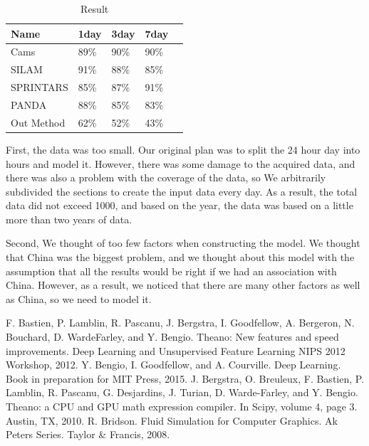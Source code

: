 \documentclass{kcc}
\begin{document}
\begin{table}[h!]
  \caption{Result}
  \centering
  \scriptsize 
  \begin{tabular}{l l l l l} \toprule 
    Name & 1day & 3day & 7day \\
    \midrule
    Cams & 89\% &  90\% & 90\%\\
    \midrule
    SILAM & 91\% & 88\% & 85\%\\
    \midrule
    SPRINTARS & 85\% & 87\% & 91\%\\
    \midrule
    PANDA & 88\% & 85\% & 83\%\\
    \midrule
    Out Method & 62\% & 52\% & 43\% \\
    \bottomrule
  \end{tabular}
  \label{tab:result}
\end{table}

First, the data was too small. Our original plan was to split the 24 hour day into hours and model it. However, there was some damage to the acquired data, and there was also a problem with the coverage of the data, so We arbitrarily subdivided the sections to create the input data every day. As a result, the total data did not exceed 1000, and based on the year, the data was based on a little more than two years of data.

Second, We thought of too few factors when constructing the model. We thought that China was the biggest problem, and we thought about this model with the assumption that all the results would be right if we had an association with China. However, as a result, we noticed that there are many other factors as well as China, so we need to model it.





\begin{thebibliography}{7}
\newblock F. Bastien, P. Lamblin, R. Pascanu, J. Bergstra, I. Goodfellow, A. Bergeron, N. Bouchard, D. WardeFarley,
and Y. Bengio. Theano: New features and speed improvements. Deep Learning and Unsupervised
Feature Learning NIPS 2012 Workshop, 2012.
\newblock Y. Bengio, I. Goodfellow, and A. Courville. Deep Learning. Book in preparation for MIT Press, 2015.
\newblock J. Bergstra, O. Breuleux, F. Bastien, P. Lamblin, R. Pascanu, G. Desjardins, J. Turian, D. Warde-Farley,
and Y. Bengio. Theano: a CPU and GPU math expression compiler. In Scipy, volume 4, page 3. Austin,
TX, 2010.
\newblock R. Bridson. Fluid Simulation for Computer Graphics. Ak Peters Series. Taylor \& Francis, 2008.

\end{thebibliography}

%
%
\end{document}
